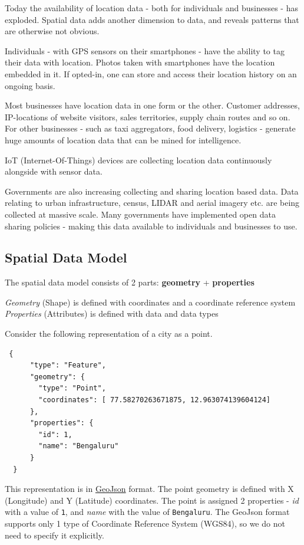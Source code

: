 \documentclass[
  12pt,
  a4paper]{article}
\begin{document}
Today the availability of location data - both for individuals and
businesses - has exploded. Spatial data adds another dimension to data,
and reveals patterns that are otherwise not obvious.

Individuals - with GPS sensors on their smartphones - have the ability
to tag their data with location. Photos taken with smartphones have the
location embedded in it. If opted-in, one can store and access their
location history on an ongoing basis.

Most businesses have location data in one form or the other. Customer
addresses, IP-locations of website visitors, sales territories, supply
chain routes and so on. For other businesses - such as taxi aggregators,
food delivery, logistics - generate huge amounts of location data that
can be mined for intelligence.

IoT (Internet-Of-Things) devices are collecting location data
continuously alongside with sensor data.

Governments are also increasing collecting and sharing location based
data. Data relating to urban infrastructure, census, LIDAR and aerial
imagery etc. are being collected at massive scale. Many governments have
implemented open data sharing policies - making this data available to
individuals and businesses to use.

\hypertarget{spatial-data-model}{%
\subsection{Spatial Data Model}\label{spatial-data-model}}

The spatial data model consists of 2 parts: \textbf{geometry} +
\textbf{properties}

\emph{Geometry} (Shape) is defined with coordinates and a coordinate
reference system \emph{Properties} (Attributes) is defined with data and
data types

Consider the following representation of a city as a point.

\begin{verbatim}
 {
      "type": "Feature",
      "geometry": {
        "type": "Point",
        "coordinates": [ 77.58270263671875, 12.963074139604124]
      },
      "properties": {
        "id": 1,
        "name": "Bengaluru"
      }
  }
\end{verbatim}

This representation is in \href{https://geojson.org/}{GeoJson} format.
The point geometry is defined with X (Longitude) and Y (Latitude)
coordinates. The point is assigned 2 properties - \emph{id} with a value
of \texttt{1}, and \emph{name} with the value of \texttt{Bengaluru}. The
GeoJson format supports only 1 type of Coordinate Reference System
(WGS84), so we do not need to specify it explicitly.
\end{document}
